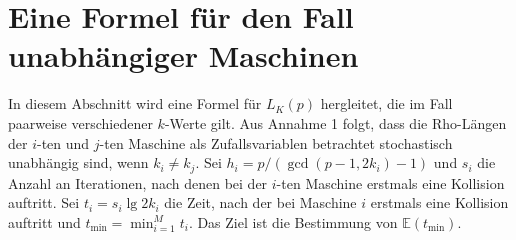 \documentclass[a4paper, 10pt, ngerman]{article}
\newcommand{\E}{\mathbb{E}}
\begin{document}
\section{Eine Formel für den Fall unabhängiger Maschinen}

In diesem Abschnitt wird eine Formel für $L_K(p)$ hergleitet, die im Fall paarweise verschiedener $k$-Werte gilt. Aus Annahme 1 folgt, dass die Rho-Längen der $i$-ten und $j$-ten Maschine als Zufallsvariablen betrachtet stochastisch unabhängig sind, wenn $k_i \ne k_j$. Sei $h_i = p/(\gcd(p - 1, 2k_i) - 1)$ und $s_i$ die Anzahl an Iterationen, nach denen bei der $i$-ten Maschine erstmals eine Kollision auftritt. Sei $t_i = s_i \lg 2k_i$ die Zeit, nach der bei Maschine $i$ erstmals eine Kollision auftritt und $t_{\min} = \min_{i = 1}^M t_i$. Das Ziel ist die Bestimmung von $\E(t_{\min})$.
\end{document}
